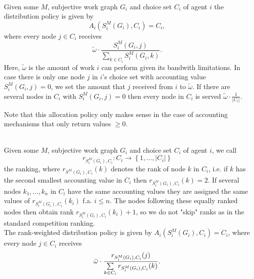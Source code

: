 \begin{example}\ \\
\label{ex:Distribution Policy}
\noindent{}Given some $M$, subjective work graph $G_i$ and choice set $C_i$ of agent $i$ the distribution policy is given by 
\[
A_i(S^M_i(G_i),C_i)=C_i,
\]
\noindent{}where every node $j\in{}C_i$ receives 
\[
\tilde{\omega}\cdot\frac{S^M_i(G_i,j)}{\sum\limits_{k\in{}C_i}S^M_i(G_i,k)}.
\]
\noindent{}Here, $\tilde{\omega}$ is the amount of work $i$ can perform given its bandwith limitations. In case there is only one node $j$ in $i$'s choice set with accounting value $S^M_i(G_i,j)=0$, we set the amount that $j$ received from $i$ to $\tilde{\omega}.$ If there are several nodes in $C_i$ with $S^M_i(G_i,j)=0$ then every node in $C_i$ is served $\tilde{\omega}\cdot\frac{1}{|C_i|}$. \vspace{1em}\\
\end{example}

\noindent{}Note that this allocation policy only makes sense in the case of accounting mechanisms that only return values $\geq{}0$. \vspace{1em}\\

\begin{example}\ \\
\label{ex:Rank-weighted Distribution Policy}
\noindent{}Given some $M$, subjective work graph $G_i$ and choice set $C_i$ of agent $i$, we call 
\[
r_{S^M_i(G_i),C_i}:C_i\rightarrow\left\lbrace{}1,\ldots,|C_i|\right\rbrace
\]
\noindent{}the ranking, where $r_{S^M(G_i),C_i}(k)$ denotes the rank of node $k$ in $C_i$, i.e. if $k$ has the second smallest accounting value in $C_i$ then $r_{S^M_i(G_i),C_i}(k)=2$. If several nodes $k_1,\ldots,k_n$ in $C_i$ have the same accounting values they are assigned the same values of $r_{S^M_i(G_i),C_i}(k_i)$ f.a. $i\leq{}n$. The nodes following these equally ranked nodes then obtain rank $r_{S^M_i(G_i),C_i}(k_i) + 1$, so we do not "skip" ranks as in the standard competition ranking. \vspace{1em}\\

\noindent{}The rank-weighted distribution policy is given by $A_i(S^M_i(G_i),C_i)=C_i$, where every node $j\in{}C_i$ receives
\[
\tilde{\omega}\cdot\frac{r_{S^M_i(G_i),C_i}(j)}{\sum\limits_{k\in{}C_i}r_{S^M_i(G_i),C_i}(k)}. \vspace{1em}\\
\]
\end{example}

